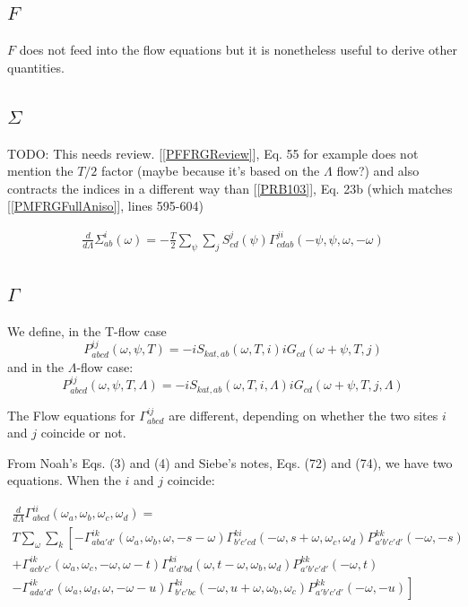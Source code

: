 \documentclass{article}
\begin{document}
\subsection{$F$}

$F$ does not feed into the flow equations but it is nonetheless useful
to derive other quantities.



\subsection{$\Sigma$}

TODO: This needs review. [\ref{PFFRGReview}], Eq. 55 for example does not mention
the $T/2$ factor
(maybe because it's based on the $\Lambda$ flow?)
and also contracts the indices in a different way
than [\ref{PRB103}], Eq. 23b (which matches [\ref{PMFRGFullAniso}], lines 595-604)


\begin{equation}
  \begin{aligned}
    \frac{d}{d\Lambda} \Sigma^{i}_{ab}(\omega) = -\frac{T}{2} \sum_\psi \sum_{j} S^{j}_{cd}(\psi)\Gamma^{ji}_{cdab}(-\psi,\psi,\omega,-\omega)
  \end{aligned}
\end{equation}

\subsection{$\Gamma$}

We define, in the T-flow case
\begin{equation}
  P^{ij}_{abcd}(\omega,\psi,T) = -iS_{kat,ab}(\omega,T,i)iG_{cd}(\omega+\psi,T,j)
\end{equation}
and in the $\Lambda$-flow case:
\begin{equation}
  P^{ij}_{abcd}(\omega,\psi,T,\Lambda) = -iS_{kat,ab}(\omega,T,i,\Lambda)iG_{cd}(\omega+\psi,T,j,\Lambda)
\end{equation}


The Flow equations for $\Gamma^{ij}_{abcd}$ are different,
depending on whether the two sites $i$ and $j$ coincide
or not.


From Noah's Eqs. (3) and (4) and Siebe's notes, Eqs. (72) and (74),
we have two equations.
When the $i$ and $j$ coincide:

\begin{equation}
  \begin{aligned}
  \frac{d}{d\Lambda} \Gamma^{ii}_{abcd}(\omega_a,\omega_b,\omega_c,\omega_d) = \\
  T \sum_{\omega} \sum_k \left[ -\Gamma^{ik}_{aba'd'}(\omega_a,\omega_b,\omega,-s-\omega)
\Gamma^{ki}_{b'c'cd}(-\omega,s+\omega,\omega_c,\omega_d)P^{kk}_{a'b'c'd'}(-\omega,-s) \right. \\
+ \Gamma^{ik}_{acb'c'}(\omega_a,\omega_c,-\omega,\omega-t)\Gamma^{ki}_{a'd'bd}(\omega,t-\omega,\omega_b,\omega_d) P^{kk}_{a'b'c'd'}(-\omega,t) \\
\left. -\Gamma^{ik}_{ada'd'}(\omega_a,\omega_d,\omega,-\omega-u)\Gamma^{ki}_{b'c'bc}(-\omega,u+\omega,\omega_b,\omega_c) P^{kk}_{a'b'c'd'}(-\omega,-u) \right]
  \end{aligned}
\end{equation}
\end{document}
